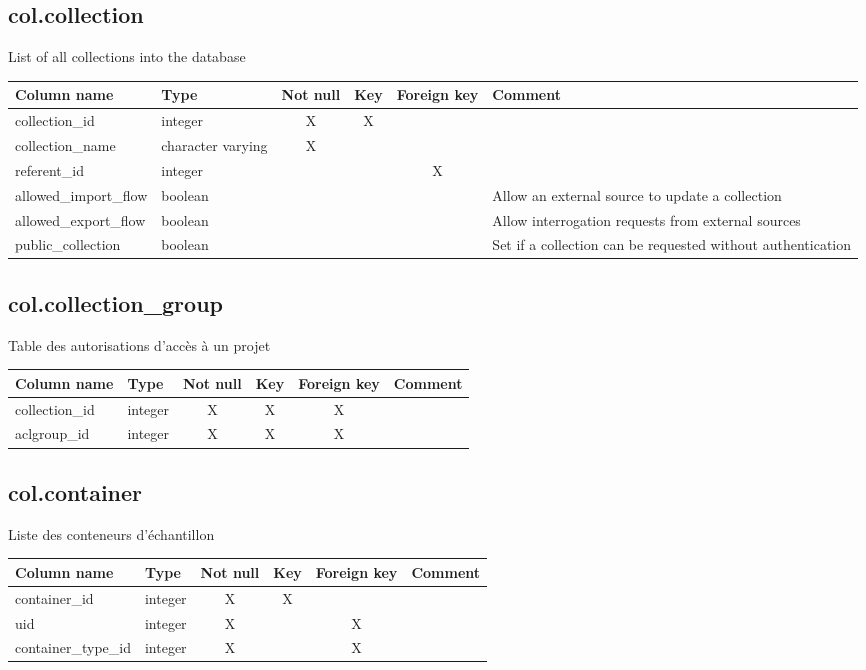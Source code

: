 \subsection{col.collection}
List of all collections into the database

\begin{tabular}{|l| p{2cm}|c|c|c| p{3cm}|}
\hline
Column name & Type & Not null & Key & Foreign key & Comment \\
\hline
collection\_id & integer & X & X & & \\
\hline
collection\_name & character varying & X & & & \\
\hline
referent\_id & integer & & & X & \\
\hline
allowed\_import\_flow & boolean & & & & Allow an external source to update a collection\\
\hline
allowed\_export\_flow & boolean & & & & Allow interrogation requests from external sources\\
\hline
public\_collection & boolean & & & & Set if a collection can be requested without authentication\\
\hline
\end{tabular}
\subsection{col.collection\_group}
Table des autorisations d'accès à un projet

\begin{tabular}{|l| p{2cm}|c|c|c| p{3cm}|}
\hline
Column name & Type & Not null & Key & Foreign key & Comment \\
\hline
collection\_id & integer & X & X & X & \\
\hline
aclgroup\_id & integer & X & X & X & \\
\hline
\end{tabular}
\subsection{col.container}
Liste des conteneurs d'échantillon

\begin{tabular}{|l| p{2cm}|c|c|c| p{3cm}|}
\hline
Column name & Type & Not null & Key & Foreign key & Comment \\
\hline
container\_id & integer & X & X & & \\
\hline
uid & integer & X & & X & \\
\hline
container\_type\_id & integer & X & & X & \\
\hline
\end{tabular}
